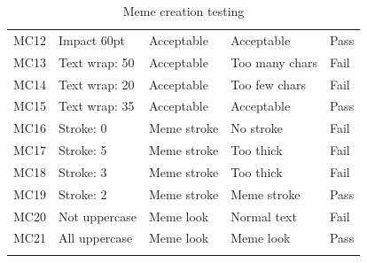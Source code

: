 \documentclass[12pt]{report}
\begin{document}
\begin{appendices}
\begin{table}[ht]
\begin{tabular}{@{\extracolsep{1pt}}lllll}
  \addlinespace[3pt]
  MC12 & Impact 60pt & Acceptable & Acceptable & Pass\\ 
  \addlinespace[3pt]
  MC13 & Text wrap: 50 & Acceptable & Too many chars & Fail\\ 
  \addlinespace[3pt]
  MC14 & Text wrap: 20 & Acceptable & Too few chars & Fail\\ 
  \addlinespace[3pt]
  MC15 & Text wrap: 35 & Acceptable & Acceptable & Pass\\ 
  \addlinespace[3pt]
  MC16 & Stroke: 0 & Meme stroke & No stroke & Fail\\ 
  \addlinespace[3pt]
  MC17 & Stroke: 5 & Meme stroke & Too thick & Fail\\ 
  \addlinespace[3pt]
  MC18 & Stroke: 3 & Meme stroke & Too thick & Fail\\ 
  \addlinespace[3pt]
  MC19 & Stroke: 2 & Meme stroke & Meme stroke & Pass\\ 
  \addlinespace[3pt]
  MC20 & Not uppercase & Meme look & Normal text & Fail\\ 
  \addlinespace[3pt]
  MC21 & All uppercase & Meme look & Meme look & Pass\\ 
  \addlinespace[3pt]
  \bottomrule
  \end{tabular}
  \caption{Meme creation testing}
\end{table}





\end{appendices}
\end{document}
